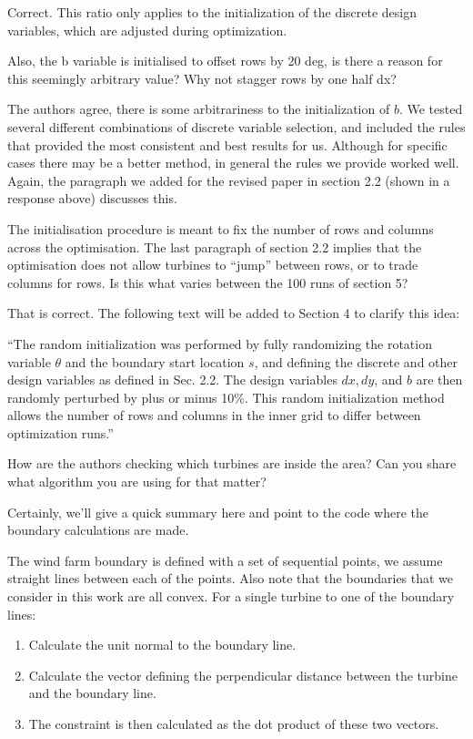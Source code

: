 \documentclass[12pt]{report}
\begin{document}
\bigskip
\color{blue}

Correct. This ratio only applies to the initialization of the discrete design variables, which are adjusted during optimization.

\color{black}
\bigskip

Also, the b variable is initialised to offset rows by 20 deg, is there a reason for this seemingly arbitrary value? Why not stagger rows by one half dx? 

\bigskip
\color{blue}

The authors agree, there is some arbitrariness to the initialization of $b$. We tested several different combinations of discrete variable selection, and included the rules that provided the most consistent and best results for us. Although for specific cases there may be a better method, in general the rules we provide worked well. Again, the paragraph we added for the revised paper in section 2.2 (shown in a response above) discusses this.


\color{black}
\bigskip

The initialisation procedure is meant to fix the number of rows and columns across the optimisation. The last paragraph of section 2.2 implies that the optimisation does not allow turbines to ``jump'' between rows, or to trade columns for rows. Is this what varies between the 100 runs of section 5? 

\bigskip
\color{blue}

That is correct. The following text will be added to Section 4 to clarify this idea:

\smallskip
``The random initialization was performed by fully randomizing the rotation variable $\theta$ and the boundary start location $s$, and defining the discrete and other design variables as defined in Sec. 2.2. The design variables $dx, dy$, and $b$ are then randomly perturbed by plus or minus 10\%. This random initialization method allows the number of rows and columns in the inner grid to differ between optimization runs.''

\color{black}
\bigskip

How are the authors checking which turbines are inside the area? Can you share what algorithm you are using for that matter? 

\bigskip
\color{blue}

Certainly, we'll give a quick summary here and point to the code where the boundary calculations are made.

The wind farm boundary is defined with a set of sequential points, we assume straight lines between each of the points. Also note that the boundaries that we consider in this work are all convex. For a single turbine to one of the boundary lines:
\begin{enumerate}
	\item Calculate the unit normal to the boundary line.
	\item Calculate the vector defining the perpendicular distance between the turbine and the boundary line.
	\item The constraint is then calculated as the dot product of these two vectors.
\end{enumerate}
\end{document}
